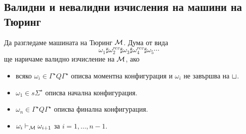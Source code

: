 












\subsection*{Валидни и невалидни изчисления на машини на Тюринг}
Да разгледаме машината на Тюринг $\mathcal{M}$.
Дума от вида 
\[\omega_1 \sharp \omega^{rev}_2 \sharp \omega_3 \sharp \omega^{rev}_4\sharp\omega_5\cdots\]
ще наричаме валидно изчисление на $\mathcal{M}$, ако 
\begin{itemize}
\item
  всяко $\omega_i \in \Gamma^\star Q \Gamma^\star$ описва моментна конфигурация
  и $\omega_i$ не завършва на $\sqcup$.
\item
  $\omega_1 \in s\Sigma^\star$ описва начална конфигурация.
\item
  $\omega_n \in \Gamma^\star Q \Gamma^\star$ описва финална конфигурация.
\item 
  $\omega_i \vdash_{\mathcal{M}} \omega_{i+1}$ за $i = 1,\dots,n-1$.
\end{itemize}

